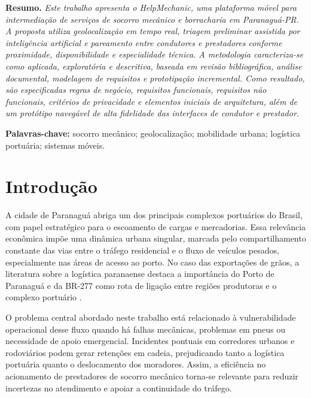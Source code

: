 \documentclass[12pt, a4paper]{article}
\newenvironment{sbcabstract}{%
  \begin{list}{}{%
    \setlength{\leftmargin}{0.8cm}%
    \setlength{\rightmargin}{0.8cm}%
    \setlength{\listparindent}{0cm}%
    \setlength{\itemindent}{0cm}%
    \setlength{\parsep}{0pt}%
  }\item\relax
}{\end{list}}
\begin{document}
\begin{sbcabstract}
\noindent \textbf{Resumo.} \textit{Este trabalho apresenta o HelpMechanic, uma plataforma móvel para intermediação de serviços de socorro mecânico e borracharia em Paranaguá-PR. A proposta utiliza geolocalização em tempo real, triagem preliminar assistida por inteligência artificial e pareamento entre condutores e prestadores conforme proximidade, disponibilidade e especialidade técnica. A metodologia caracteriza-se como aplicada, exploratória e descritiva, baseada em revisão bibliográfica, análise documental, modelagem de requisitos e prototipação incremental. Como resultado, são especificadas regras de negócio, requisitos funcionais, requisitos não funcionais, critérios de privacidade e elementos iniciais de arquitetura, além de um protótipo navegável de alta fidelidade das interfaces de condutor e prestador.}

\vspace{6pt}
{\sloppy \noindent \textbf{Palavras-chave:} socorro mecânico; geolocalização; mobilidade urbana; logística portuária; sistemas móveis.\par}
\end{sbcabstract}


\section{Introdução}

A cidade de Paranaguá abriga um dos principais complexos portuários do Brasil, com papel estratégico para o escoamento de cargas e mercadorias. Essa relevância econômica impõe uma dinâmica urbana singular, marcada pelo compartilhamento constante das vias entre o tráfego residencial e o fluxo de veículos pesados, especialmente nas áreas de acesso ao porto. No caso das exportações de grãos, a literatura sobre a logística paranaense destaca a importância do Porto de Paranaguá e da BR-277 como rota de ligação entre regiões produtoras e o complexo portuário \cite{aguilar2018, fantin2025}.

O problema central abordado neste trabalho está relacionado à vulnerabilidade operacional desse fluxo quando há falhas mecânicas, problemas em pneus ou necessidade de apoio emergencial. Incidentes pontuais em corredores urbanos e rodoviários podem gerar retenções em cadeia, prejudicando tanto a logística portuária quanto o deslocamento dos moradores. Assim, a eficiência no acionamento de prestadores de socorro mecânico torna-se relevante para reduzir incertezas no atendimento e apoiar a continuidade do tráfego.
\end{document}
